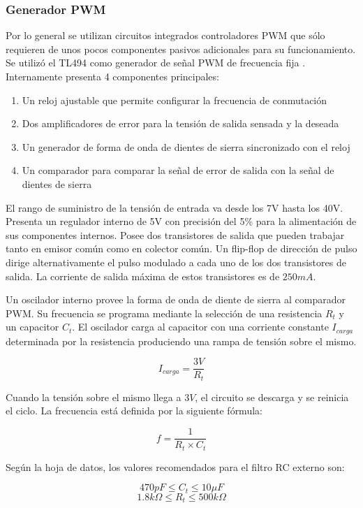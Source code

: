 \subsubsection{Generador PWM}

Por lo general se utilizan circuitos integrados controladores PWM que sólo requieren de unos pocos componentes pasivos adicionales para su funcionamiento. 
Se utilizó el TL494 como generador de señal PWM de frecuencia fija \cite{tl494}. 
Internamente presenta 4 componentes principales:
\begin{enumerate}
    \item Un reloj ajustable que permite configurar la frecuencia de conmutación
    \item Dos amplificadores de error para la tensión de salida sensada y la deseada
    \item Un generador de forma de onda de dientes de sierra sincronizado con el reloj
    \item Un comparador para comparar la señal de error de salida con la señal de dientes de sierra
\end{enumerate}
 
El rango de suministro de la tensión de entrada va desde los 7V hasta los 40V. 
Presenta un regulador interno de 5V con precisión del 5\% para la alimentación de sus componentes internos.
Posee dos transistores de salida que pueden trabajar tanto en emisor común como en colector común. 
Un flip-flop de dirección de pulso dirige alternativamente el pulso modulado a cada uno de los dos transistores de salida. 
La corriente de salida máxima de estos transistores es de $250mA$.

Un oscilador interno provee la forma de onda de diente de sierra al comparador PWM. 
Su frecuencia se programa mediante la selección de una resistencia $R_t$ y un capacitor $C_t$. 
El oscilador carga al capacitor con una corriente constante $I_{carga}$ determinada por la resistencia produciendo una rampa de tensión sobre el mismo.

$$ I_{carga}=\frac{3V}{R_t} $$

Cuando la tensión sobre el mismo llega a $3V$, el circuito se descarga y se reinicia el ciclo. 
La frecuencia está definida por la siguiente fórmula:

$$ f=\frac{1}{R_t\times C_t} $$

Según la hoja de datos, los valores recomendados para el filtro RC externo son:

$$ 470pF\leq C_t\leq 10\mu F$$
$$ 1.8k\Omega\leq R_t\leq 500k\Omega $$


